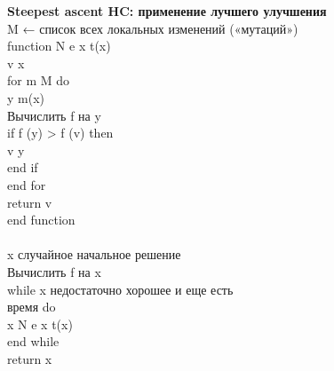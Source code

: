 \textbf{Steepest ascent HC: применение лучшего улучшения}\\
M ← список всех локальных изменений («мутаций»)
\\
function N e x t(x)  \\
\tab v \leftarrow x   \\
\tab for m \leftarrow M do  \\
\tab \tab y \leftarrow m(x)  \\
\tab \tab Вычислить f на y \\ 
\tab \tab if f (y) > f (v) then \\  
\tab \tab \tab v \leftarrow y \\  
\tab \tab end if \\ 
\tab end for \\ 
\tab return v \\ 
end function \\ 
\\
x \leftarrow случайное начальное решение  \\
Вычислить f на x  \\
while x недостаточно хорошее и еще есть  \\
время do  \\
\tab x \leftarrow N e x t(x)\\
end while   \\
return x\\ 

